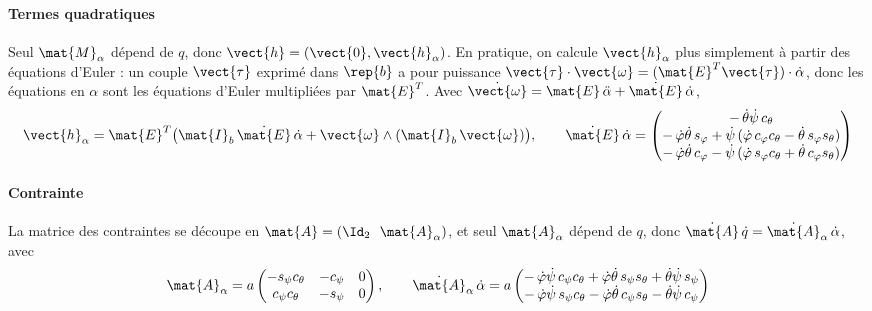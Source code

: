 \paragraph{Termes quadratiques}
Seul $\mat{M}_\alpha$ dépend de $q$, donc
$\vect{h} = (\vect{0},\vect{h}_\alpha)$. En pratique, on calcule
$\vect{h}_\alpha$ plus simplement à partir des équations d'Euler : un
couple $\vect{\tau}$ exprimé dans $\rep{b}$ a pour puissance
$\vect{\tau}\cdot\vect{\omega} = (\mat{E}^T\vect{\tau})\cdot\dot\alpha$,
donc les équations en $\alpha$ sont les équations d'Euler multipliées
par $\mat{E}^T$. Avec $\dot{\vect{\omega}} = \mat{E}\,\ddot\alpha
+ \dot{\mat{E}}\,\dot\alpha$,
\[
    \vect{h}_\alpha = \mat{E}^T\bigl(\mat{I}_b\,\dot{\mat{E}}\,\dot\alpha
    + \vect{\omega}\wedge(\mat{I}_b\,\vect{\omega})\bigr),
    \qquad
    \dot{\mat{E}}\,\dot\alpha = \begin{pmatrix}
        -\,\dot\theta\dot\psi\,c_\theta\\
        -\,\dot\varphi\dot\theta\,s_\varphi
            + \dot\psi\,(\dot\varphi\,c_\varphi c_\theta
            - \dot\theta\,s_\varphi s_\theta)\\
        -\,\dot\varphi\dot\theta\,c_\varphi
            - \dot\psi\,(\dot\varphi\,s_\varphi c_\theta
            + \dot\theta\,c_\varphi s_\theta)
    \end{pmatrix}
\]

\paragraph{Contrainte}
La matrice des contraintes se découpe en
$\mat{A} = (\Id_2\ \ \mat{A}_\alpha)$, et seul $\mat{A}_\alpha$ dépend
de $q$, donc $\dot{\mat{A}}\,\dot q = \dot{\mat{A}}_\alpha\,\dot\alpha$,
avec
\[
    \mat{A}_\alpha = a\begin{pmatrix}
        -s_\psi c_\theta & -c_\psi & 0\\
        c_\psi c_\theta & -s_\psi & 0
    \end{pmatrix},
    \qquad
    \dot{\mat{A}}_\alpha\,\dot\alpha = a\begin{pmatrix}
        -\,\dot\varphi\dot\psi\,c_\psi c_\theta
            + \dot\varphi\dot\theta\,s_\psi s_\theta
            + \dot\theta\dot\psi\,s_\psi\\
        -\,\dot\varphi\dot\psi\,s_\psi c_\theta
            - \dot\varphi\dot\theta\,c_\psi s_\theta
            - \dot\theta\dot\psi\,c_\psi
    \end{pmatrix}
\]

